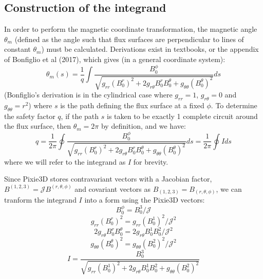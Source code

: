 \documentclass[12pt]{article}
\begin{document}
\subsection{Construction of the integrand}
In order to perform the magnetic coordinate transformation, the magnetic angle $\theta_m$ (defined as the angle such that flux surfaces are perpendicular to lines of constant $\theta_m$) must be calculated.
Derivations exist in textbooks, or the appendix of Bonfiglio et al (2017), which gives (in a general coordinate system):
\begin{equation}\label{1}
    \theta_m(s) = \frac{1}{q} \int \frac{B^{\phi}_0}{\sqrt{g_{rr} (B^r_0)^2 + 2 g_{r\theta} B^r_0 B^\theta_0 + g_{\theta\theta} (B^\theta_0)^2}} ds
\end{equation}
(Bonfiglio's derivation is in the cylindrical case where $g_{rr} = 1$, $g_{r\theta} = 0$ and $g_{\theta\theta} = r^2$)
where $s$ is the path defining the flux surface at a fixed $\phi$.
To determine the safety factor $q$, if the path $s$ is taken to be exactly 1 complete circuit around the flux surface, then $\theta_m = 2\pi$ by definition, and we have:
\begin{equation}\label{2}
    q = \frac{1}{2\pi} \oint \frac{B^{\phi}_0}{\sqrt{g_{rr} (B^r_0)^2 + 2 g_{r\theta} B^r_0 B^\theta_0 + g_{\theta\theta} (B^\theta_0)^2}} ds = \frac{1}{2\pi} \oint I ds
\end{equation}
where we will refer to the integrand as $I$ for brevity.

Since Pixie3D stores contravariant vectors with a Jacobian factor, $B^{(1,2,3)} = \mathcal{J}B^{(r,\theta,\phi)} $ and covariant vectors as $B_{(1,2,3)} = B_{(r,\theta,\phi)} $, we can tranform the integrand $I$ into a form using the Pixie3D vectors:
\begin{equation}
    B^{\phi}_0 = B^3_0 / \mathcal{J}
\end{equation}
\begin{equation}
    g_{rr} (B^r_0)^2 = g_{rr}(B^1_0)^2 / \mathcal{J}^2
\end{equation}
\begin{equation}
    2 g_{r\theta} B^r_0 B^\theta_0 = 2 g_{r\theta} B^1_0 B^2_0 / \mathcal{J}^2
\end{equation}
\begin{equation}
    g_{\theta\theta} (B^\theta_0)^2 = g_{\theta\theta} (B^2_0)^2 / \mathcal{J}^2
\end{equation}
\begin{equation}
    I = \frac{B^3_0}{\sqrt{g_{rr}(B^1_0)^2 + 2 g_{r\theta} B^1_0 B^2_0 + g_{\theta\theta} (B^2_0)^2}}
\end{equation}
\end{document}
